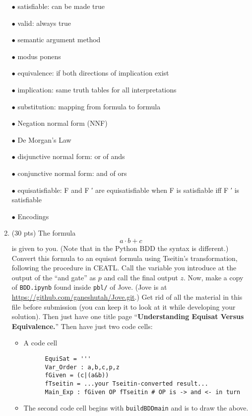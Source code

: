 \documentclass[11pt]{article}
\begin{document}
\begin{enumerate}
\begin{minipage}{\minpagw}
{{      $\bullet$ satisfiable: can be made true
      
      $\bullet$ valid: always true
      
      $\bullet$ semantic argument method
      
      $\bullet$ modus ponens
      
      $\bullet$ equivalence: if both directions of implication exist
      
      $\bullet$ implication: same truth tables for all interpretations
      
      $\bullet$ substitution: mapping from formula to formula
      
      $\bullet$ Negation normal form (NNF) 
      
      $\bullet$ De Morgan’s Law
      
      $\bullet$ disjunctive normal form: or of ands
      
      $\bullet$ conjunctive normal form: and of ors
      
      $\bullet$ equisatisfiable: F and F ′ are equisatisfiable when F is satisfiable iff F ′ is satisfiable
      
      $\bullet$ Encodings
    }%
  }%
\end{minipage}

\clearpage


\item (30 pts) The formula
  \[ a\cdot b + c \]
  is given to you. (Note that in the Python BDD the syntax is different.)
  Convert this formula to an equisat formula using Tseitin's transformation,
  following the procedure in CEATL. Call the variable you introduce at the output
  of the ``and gate'' as $p$ and call the final output $z$.
  Now, make a copy of \verb|BDD.ipynb| found inside \verb|pbl/| of Jove.
  (Jove is at \url{https://github.com/ganeshutah/Jove.git}.)
  Get rid of all the material in this file before submission (you can keep it to look at it
  while developing your solution).
  Then just have one title page ``{\bf Understanding Equisat Versus Equivalence.}''
  Then have just two code cells:
  \begin{itemize}
  \item A code cell
    \begin{verbatim}
      EquiSat = '''
      Var_Order : a,b,c,p,z
      fGiven = (c|(a&b))
      fTseitin = ...your Tseitin-converted result...
      Main_Exp : fGiven OP fTseitin # OP is -> and <- in turn
\end{verbatim}
  \item The second code cell begins with {\tt buildBDDmain} and is to draw the above.
  \end{itemize}
  

\end{enumerate}
\end{document}
